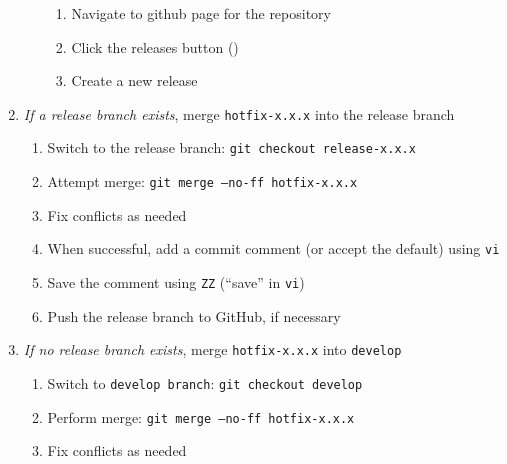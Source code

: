 \documentclass{article}
\begin{document}
\begin{enumerate}
\begin{enumerate}
\begin{enumerate}
	  \item Navigate to github page for the repository

	  \item Click the releases button ()
	  
	  \item Create a new release

	\end{enumerate}
  \end{enumerate}
  
  \item \emph{If a release branch exists}, 
  		merge \texttt{hotfix-x.x.x} into the release branch
  \begin{enumerate}

    \item Switch to the release branch: \texttt{git checkout release-x.x.x} 

    \item Attempt merge: \texttt{git merge --no-ff hotfix-x.x.x}
	
	\item Fix conflicts as needed
	
	\item When successful, add a commit comment (or accept the default) using \texttt{vi} 
	
	\item Save the comment using \texttt{ZZ} (``save'' in \texttt{vi})
	
	\item Push the release branch to GitHub, if necessary

  \end{enumerate}
  \item \emph{If no release branch exists}, merge \texttt{hotfix-x.x.x} into \texttt{develop} 
  \begin{enumerate}

    \item Switch to \texttt{develop branch}: \texttt{git checkout develop} 

    \item Perform merge: \texttt{git merge --no-ff hotfix-x.x.x} 
	
	\item Fix conflicts as needed
	

\end{enumerate}
\end{enumerate}
\end{document}
